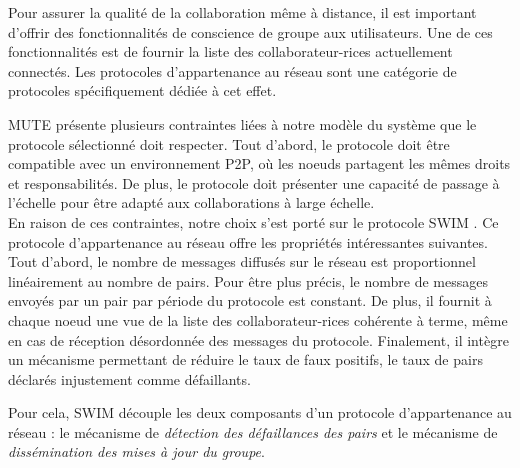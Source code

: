 \label{sec:mute-membership-protocol}

Pour assurer la qualité de la collaboration même à distance, il est important d'offrir des fonctionnalités de conscience de groupe aux utilisateurs.
Une de ces fonctionnalités est de fournir la liste des collaborateur-rices actuellement connectés.
Les protocoles d'appartenance au réseau sont une catégorie de protocoles spécifiquement dédiée à cet effet.

MUTE présente plusieurs contraintes liées à notre modèle du système que le protocole sélectionné doit respecter.
Tout d'abord, le protocole doit être compatible avec un environnement \ac{P2P}, où les noeuds partagent les mêmes droits et responsabilités.
De plus, le protocole doit présenter une capacité de passage à l'échelle pour être adapté aux collaborations à large échelle.\\

En raison de ces contraintes, notre choix s'est porté sur le protocole SWIM \cite{swim2002}.
Ce protocole d'appartenance au réseau offre les propriétés intéressantes suivantes.
Tout d'abord, le nombre de messages diffusés sur le réseau est proportionnel linéairement au nombre de pairs.
Pour être plus précis, le nombre de messages envoyés par un pair par période du protocole est constant.
De plus, il fournit à chaque noeud une vue de la liste des collaborateur-rices cohérente à terme, même en cas de réception désordonnée des messages du protocole.
Finalement, il intègre un mécanisme permettant de réduire le taux de faux positifs, \ie le taux de pairs déclarés injustement comme défaillants.

Pour cela, SWIM découple les deux composants d'un protocole d'appartenance au réseau : le mécanisme de \emph{détection des défaillances des pairs} et le mécanisme de \emph{dissémination des mises à jour du groupe}.
